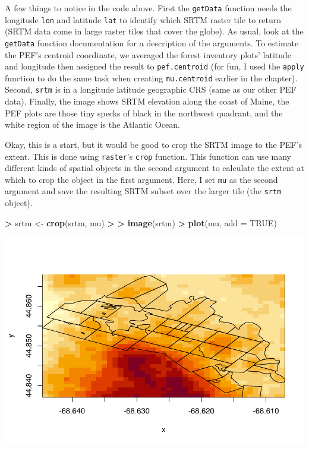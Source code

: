 \documentclass[
]{krantz}
\makeatletter
\newenvironment{Shaded}{\begin{snugshade}}{\end{snugshade}}
\newcommand{\DataTypeTok}[1]{\textcolor[rgb]{0.27,0.27,0.27}{#1}}
\newcommand{\ErrorTok}[1]{\textcolor[rgb]{0.14,0.14,0.14}{\textbf{#1}}}
\newcommand{\KeywordTok}[1]{\textcolor[rgb]{0.27,0.27,0.27}{\textbf{#1}}}
\newcommand{\NormalTok}[1]{#1}
\newcommand{\OperatorTok}[1]{\textcolor[rgb]{0.43,0.43,0.43}{\textbf{#1}}}
\newcommand{\OtherTok}[1]{\textcolor[rgb]{0.37,0.37,0.37}{#1}}
\newcommand{\StringTok}[1]{\textcolor[rgb]{0.5,0.5,0.5}{#1}}
\newenvironment{kframe}{%
\medskip{}
\setlength{\fboxsep}{.8em}
 \def\at@end@of@kframe{}%
 \ifinner\ifhmode%
  \def\at@end@of@kframe{\end{minipage}}%
  \begin{minipage}{\columnwidth}%
 \fi\fi%
 \def\FrameCommand##1{\hskip\@totalleftmargin \hskip-\fboxsep
 \colorbox{shadecolor}{##1}\hskip-\fboxsep
     \hskip-\linewidth \hskip-\@totalleftmargin \hskip\columnwidth}%
 \MakeFramed {\advance\hsize-\width
   \@totalleftmargin\z@ \linewidth\hsize
   \@setminipage}}%
 {\par\unskip\endMakeFramed%
 \at@end@of@kframe}
\renewenvironment{Shaded}{\begin{kframe}}{\end{kframe}}
\makeatother
\begin{document}
A few things to notice in the code above. First the \texttt{getData} function needs the longitude \texttt{lon} and latitude \texttt{lat} to identify which SRTM raster tile to return (SRTM data come in large raster tiles that cover the globe). As usual, look at the \texttt{getData} function documentation for a description of the arguments. To estimate the PEF's centroid coordinate, we averaged the forest inventory plots' latitude and longitude then assigned the result to \texttt{pef.centroid} (for fun, I used the \texttt{apply} function to do the same task when creating \texttt{mu.centroid} earlier in the chapter). Second, \texttt{srtm} is in a longitude latitude geographic CRS (same as our other PEF data). Finally, the image shows SRTM elevation along the coast of Maine, the PEF plots are those tiny specks of black in the northwest quadrant, and the white region of the image is the Atlantic Ocean.

Okay, this is a start, but it would be good to crop the SRTM image to the PEF's extent. This is done using \texttt{raster}'s \texttt{crop} function. This function can use many different kinds of spatial objects in the second argument to calculate the extent at which to crop the object in the first argument. Here, I set \texttt{mu} as the second argument and save the resulting SRTM subset over the larger tile (the \texttt{srtm} object).

\begin{Shaded}
\begin{Highlighting}[]
\OperatorTok{\textgreater{}}\StringTok{ }\NormalTok{srtm \textless{}{-}}\StringTok{ }\KeywordTok{crop}\NormalTok{(srtm, mu)}
\OperatorTok{\textgreater{}}\StringTok{ }
\ErrorTok{\textgreater{}}\StringTok{ }\KeywordTok{image}\NormalTok{(srtm)}
\OperatorTok{\textgreater{}}\StringTok{ }\KeywordTok{plot}\NormalTok{(mu, }\DataTypeTok{add =} \OtherTok{TRUE}\NormalTok{)}
\end{Highlighting}
\end{Shaded}

\includegraphics{bookdown_files/figure-latex/unnamed-chunk-214-1.pdf}
\end{document}

